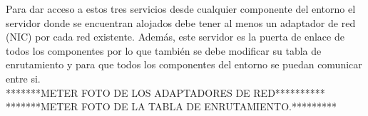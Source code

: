     \fi
    Para dar acceso a estos tres servicios desde cualquier componente del entorno el servidor donde se encuentran alojados debe tener al menos un adaptador de red (NIC) por cada red existente. Además, este servidor es la puerta de enlace de todos los componentes por lo que también se debe modificar su tabla de enrutamiento y para que todos los componentes del entorno se puedan comunicar entre si.\\
    *******METER FOTO DE LOS ADAPTADORES DE RED**********\\
    *******METER FOTO DE LA TABLA DE ENRUTAMIENTO.*********
    
\FloatBarrier
    
    
    

